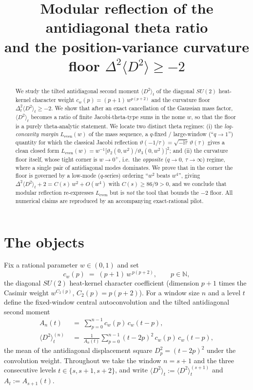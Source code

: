 \documentclass[11pt]{article}
\title{Modular reflection of the antidiagonal theta ratio\\
and the position-variance curvature floor $\Delta^2\langle D^2\rangle\ge-2$}
\author{}
\date{}
\theoremstyle{definition}
\newcommand{\N}{\mathbb{N}}
\newcommand{\ii}{\mathrm{i}}
\newcommand{\Dsq}{\langle D^2\rangle}
\begin{document}
\maketitle

\begin{abstract}
We study the tilted antidiagonal second moment $\Dsq_t$ of the diagonal
$SU(2)$ heat-kernel character weight $c_w(p)=(p+1)\,w^{p(p+2)}$ and the
curvature floor $\Delta^2_t\Dsq_t\ge-2$. We show that after an exact
cancellation of the Gaussian mass factor, $\Dsq_t$ becomes a ratio of finite
Jacobi-theta-type sums in the nome $w$, so that the floor is a purely
theta-analytic statement. We locate two distinct theta regimes: (i) the
\emph{log-concavity margin} $L_{\mathrm{even}}(w)$ of the mass sequence, a
$q$-fixed / large-window (``$q\to1$'') quantity for which the classical Jacobi
reflection $\vartheta(-1/\tau)=\sqrt{-\ii\tau}\,\vartheta(\tau)$ gives a clean
closed form $L_{\mathrm{even}}(w)=w^{-1}\bigl[\vartheta_2(0,w^2)/\vartheta_3(0,w^2)\bigr]^2$;
and (ii) the curvature floor itself, whose tight corner is $w\to0^+$, i.e.\ the
\emph{opposite} ($q\to0$, $\tau\to\infty$) regime, where a single pair of
antidiagonal modes dominates. We prove that in the corner the floor is governed
by a low-mode ($q$-series) ordering ``$w^2$ beats $w^4$'', giving
$\Delta^2\Dsq_t+2 = C(s)\,w^2+O(w^4)$ with $C(s)\ge 86/9>0$, and we conclude
that modular reflection re-expresses $L_{\mathrm{even}}$ but is \emph{not} the
tool that bounds the $-2$ floor. All numerical claims are reproduced by an
accompanying exact-rational pilot.
\end{abstract}

\section{The objects}

Fix a rational parameter $w\in(0,1)$ and set
\[
  c_w(p) \;=\; (p+1)\,w^{\,p(p+2)}, \qquad p\in\N,
\]
the diagonal $SU(2)$ heat-kernel character coefficient (dimension $p+1$ times
the Casimir weight $w^{C_2(p)}$, $C_2(p)=p(p+2)$). For a window size $n$ and a
level $t$ define the fixed-window central autoconvolution and the tilted
antidiagonal second moment
\begin{align}
  A_n(t) &\;=\; \sum_{p=0}^{n-1} c_w(p)\,c_w(t-p),\\
  \Dsq_t^{(n)} &\;=\; \frac{1}{A_n(t)}\sum_{p=0}^{n-1} (t-2p)^2\,c_w(p)\,c_w(t-p),
\end{align}
the mean of the antidiagonal displacement square $D_p^2=(t-2p)^2$ under the
convolution weight. Throughout we take the window $n=s+1$ and the three
consecutive levels $t\in\{s,s+1,s+2\}$, and write
$\Dsq_t:=\Dsq_t^{(s+1)}$ and $A_t:=A_{s+1}(t)$.
\end{document}
